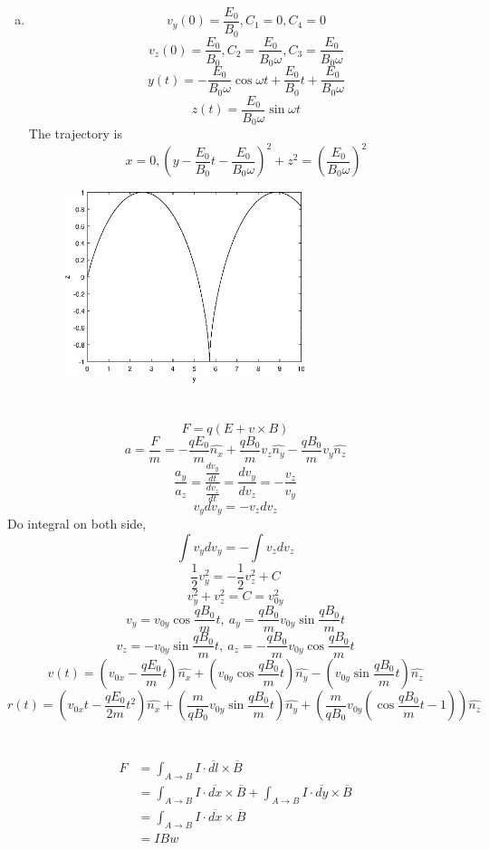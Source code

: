 \documentclass{article}
\begin{document}
\begin{enumerate}[(a)]
\begin{figure}[h!]
    \label{fig-1-2}
\end{figure}
\item
$$v_y(0)=\frac{E_0}{B_0},C_1=0,C_4=0$$
$$v_z(0)=\frac{E_0}{B_0},C_2=\frac{E_0}{B_0\omega},C_3=\frac{E_0}{B_0\omega}$$
$$y(t)=-\frac{E_0}{B_0\omega}\cos\omega t+\frac{E_0}{B_0}t+\frac{E_0}{B_0\omega}$$
$$z(t)=\frac{E_0}{B_0\omega}\sin\omega t$$
The trajectory is
$$x=0,\left(y-\frac{E_0}{B_0}t-\frac{E_0}{B_0\omega}\right)^2+z^2=\left(\frac{E_0}{B_0\omega}\right)^2$$
\begin{figure}[h!]
    \centering
    \includegraphics[width=7cm]{1_3.eps}
    \label{fig-1-3}
\end{figure}

\end{enumerate}


\section{}
	$$F=q(E+v\times B)$$
	$$a=\frac{F}{m}=-\frac{qE_0}{m}\hat{n_x}+\frac{qB_0}{m}v_z\hat{n_y}-\frac{qB_0}{m}v_y\hat{n_z}$$
	$$\frac{a_y}{a_z}=\frac{\frac{dv_y}{dt}}{\frac{dv_z}{dt}}=\frac{dv_y}{dv_z}=-\frac{v_z}{v_y}$$
	$$v_ydv_y=-v_zdv_z$$
	Do integral on both side,
	$$\int v_ydv_y=-\int v_zdv_z$$
	$$\frac{1}{2}v_y^2=-\frac{1}{2}v_z^2+C$$
	$$v_y^2+v_z^2=C=v_{0y}^2$$
	$$v_y=v_{0y}\cos\frac{qB_0}{m}t,\ a_y=\frac{qB_0}{m}v_{0y}\sin\frac{qB_0}{m}t$$
	$$v_z=-v_{0y}\sin\frac{qB_0}{m}t,\ a_z=-\frac{qB_0}{m}v_{0y}\cos\frac{qB_0}{m}t$$
	$$v(t)=\left(v_{0x}-\frac{qE_0}{m}t\right)\hat{n_x}+
	\left(v_{0y}\cos\frac{qB_0}{m}t\right)\hat{n_y}-
	\left(v_{0y}\sin\frac{qB_0}{m}t\right)\hat{n_z}$$
	$$r(t)=\left(v_{0x}t-\frac{qE_0}{2m}t^2\right)\hat{n_x}+
	\left(\frac{m}{qB_0}v_{0y}\sin\frac{qB_0}{m}t\right)\hat{n_y}+
	\left(\frac{m}{qB_0}v_{0y}(\cos\frac{qB_0}{m}t-1)\right)\hat{n_z}$$

\section{}
\begin{align*}
F&=\int_{A\to B}I\cdot\overline{dl}\times\overline{B}\\
&=\int_{A\to B}I\cdot\overline{dx}\times\overline{B}+\int_{A\to B}I\cdot\overline{dy}\times\overline{B}\\
&=\int_{A\to B}I\cdot\overline{dx}\times\overline{B}\\
&=IBw
\end{align*}
\end{document}
